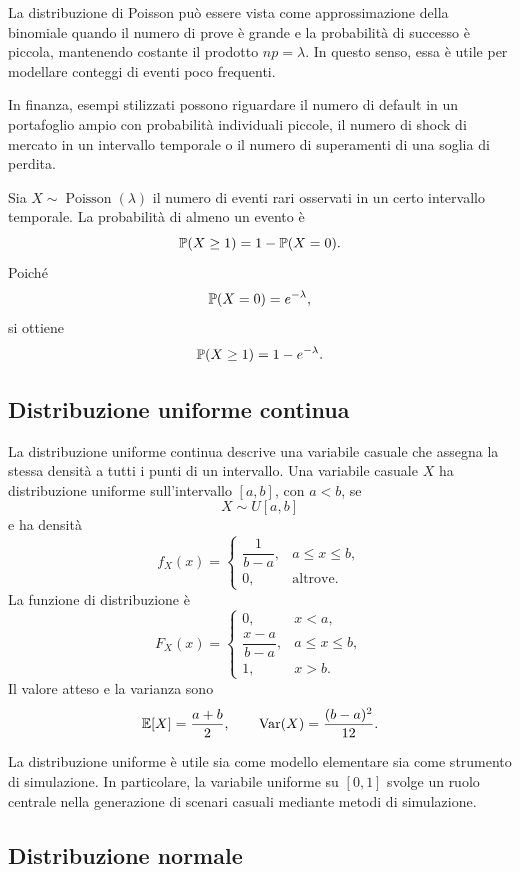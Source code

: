 La distribuzione di Poisson pu\`{o} essere vista come approssimazione della
binomiale quando il numero di prove \`{e} grande e la probabilit\`{a} di successo
\`{e} piccola, mantenendo costante il prodotto $np=\lambda$. In questo senso,
essa \`{e} utile per modellare conteggi di eventi poco frequenti.

In finanza, esempi stilizzati possono riguardare il numero di default in un
portafoglio ampio con probabilit\`{a} individuali piccole, il numero di shock di
mercato in un intervallo temporale o il numero di superamenti di una soglia di
perdita.

\begin{example}
Sia $X\sim \operatorname{Poisson}(\lambda)$ il numero di eventi rari osservati in
un certo intervallo temporale. La probabilit\`{a} di almeno un evento \`{e}
\[
\mathbb{P}(X\geq 1)
=
1-\mathbb{P}(X=0).
\]
Poich\'{e}
\[
\mathbb{P}(X=0)=e^{-\lambda},
\]
si ottiene
\[
\mathbb{P}(X\geq 1)=1-e^{-\lambda}.
\]
\end{example}

\subsection{Distribuzione uniforme continua}

La distribuzione uniforme continua descrive una variabile casuale che assegna la
stessa densit\`{a} a tutti i punti di un intervallo. Una variabile casuale $X$ ha
distribuzione uniforme sull'intervallo $[a,b]$, con $a<b$, se
\[
X\sim U[a,b]
\]
e ha densit\`{a}
\[
f_X(x)=
\begin{cases}
\dfrac{1}{b-a}, & a\leq x\leq b,\\[6pt]
0, & \mbox{altrove}.
\end{cases}
\]
La funzione di distribuzione \`{e}
\[
F_X(x)=
\begin{cases}
0, & x<a,\\[4pt]
\dfrac{x-a}{b-a}, & a\leq x\leq b,\\[8pt]
1, & x>b.
\end{cases}
\]
Il valore atteso e la varianza sono
\[
\mathbb{E}[X]=\frac{a+b}{2},
\qquad
\operatorname{Var}(X)=\frac{(b-a)^2}{12}.
\]

La distribuzione uniforme \`{e} utile sia come modello elementare sia come
strumento di simulazione. In particolare, la variabile uniforme su $[0,1]$
svolge un ruolo centrale nella generazione di scenari casuali mediante metodi di
simulazione.

\subsection{Distribuzione normale}

